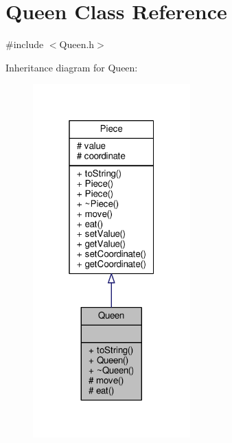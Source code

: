 \hypertarget{class_queen}{}\section{Queen Class Reference}
\label{class_queen}


{\ttfamily \#include $<$Queen.\+h$>$}



Inheritance diagram for Queen\+:
\nopagebreak
\begin{figure}[H]
\begin{center}
\leavevmode
\includegraphics[width=172pt]{class_queen__inherit__graph}
\end{center}
\end{figure}


